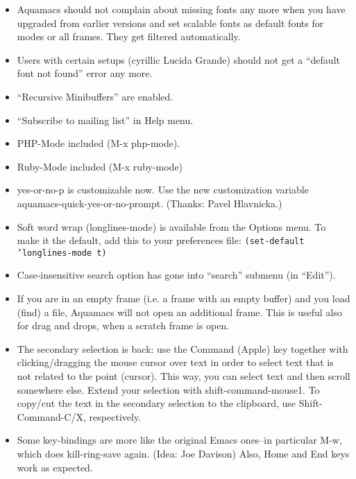 \begin{itemize}
	
\item Aquamacs should not complain about missing fonts any more when
    you have upgraded from earlier versions and set scalable fonts as
    default fonts for modes or all frames. They get filtered  automatically.

\item Users with certain setups (cyrillic Lucida Grande) should not get
    a ``default font not found'' error any more.
 

\item ``Recursive Minibuffers'' are enabled. 

\item ``Subscribe to mailing list'' in Help menu.

\item PHP-Mode included (M-x php-mode).

\item Ruby-Mode included (M-x ruby-mode)

\item yes-or-no-p is customizable now. Use the new customization
 	variable aquamacs-quick-yes-or-no-prompt. (Thanks: Pavel Hlavnicka.)

\item Soft word wrap (longlines-mode) is available from the Options
	menu. To make it the default, add this to your preferences
	file:	
	\texttt{(set-default 'longlines-mode t)}

\item Case-insensitive search option has gone into ``search'' submenu (in ``Edit'').

\item If you are in an empty frame (i.e. a frame with an empty buffer)
	and you load (find) a file, Aquamacs will not open an additional frame.
	This is useful also for drag and drops, when a scratch frame is open.

\item The secondary selection is back: use the Command (Apple) key
    together with clicking/dragging the mouse cursor over text in
    order to select text that is not related to the point
    (cursor). This way, you can select text and then scroll somewhere
    else. Extend your selection with shift-command-mouse1.
    To copy/cut the text in the secondary selection to the  clipboard, use
    Shift-Command-C/X, respectively.

\item Some key-bindings are more like the original Emacs ones--in
    particular M-w, which does kill-ring-save again.
    (Idea: Joe Davison)   Also, Home and End keys work as expected.


\end{itemize}
